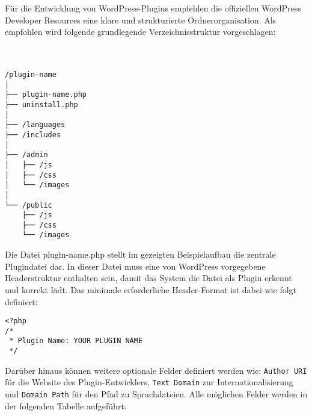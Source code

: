 Für die Entwicklung von WordPress-Plugins empfehlen die offiziellen WordPress Developer Resources eine klare und strukturierte Ordnerorganisation. \cite{wordpress2024BestPractices}
Als empfohlen wird folgende grundlegende Verzeichnisstruktur vorgeschlagen:
\\\\\\
\begin{lstlisting}[caption={Beispielhafte Plugin-Verzeichnisstruktur in WordPress}, label={lst:plugin-structure}]
/plugin-name
│
├── plugin-name.php
├── uninstall.php
│
├── /languages
├── /includes
│
├── /admin
│   ├── /js
│   ├── /css
│   └── /images
│
└── /public
    ├── /js
    ├── /css
    └── /images
\end{lstlisting}

Die Datei plugin-name.php stellt im gezeigten Beispielaufbau die zentrale Plugindatei dar.
In dieser Datei muss eine von WordPress vorgegebene Headerstruktur enthalten sein, damit das System die Datei als Plugin erkennt und korrekt lädt.
Das minimale erforderliche Header-Format ist dabei wie folgt definiert:

\begin{lstlisting}[caption={Minimaler Plugin-Header in WordPress}, label={lst:plugin-header}]
<?php
/*
 * Plugin Name: YOUR PLUGIN NAME
 */
\end{lstlisting}

Darüber hinaus können weitere optionale Felder definiert werden wie:
\texttt{Author URI} für die Website des Plugin-Entwicklers, \texttt{Text Domain}
zur Internationalisierung und \texttt{Domain Path} für den Pfad zu Sprachdateien.
Alle möglichen Felder werden in der folgenden Tabelle aufgeführt:
\renewcommand{\arraystretch}{1.3}

